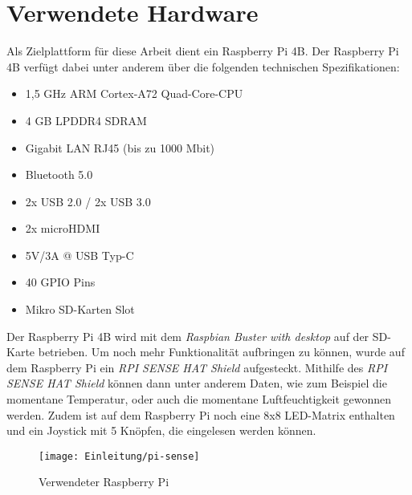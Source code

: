 \section{Verwendete Hardware}
\label{sec:verwendeteHardware}
Als Zielplattform für diese Arbeit dient ein Raspberry Pi 4B. Der Raspberry Pi 4B
verfügt dabei unter anderem über die folgenden technischen Spezifikationen: \cite{RasberryPiSpecs}
\begin{itemize}
    \item 1,5 GHz ARM Cortex-A72 Quad-Core-CPU
    \item 4 GB LPDDR4 SDRAM
    \item Gigabit LAN RJ45 (bis zu 1000 Mbit)
    \item Bluetooth 5.0
    \item 2x USB 2.0 / 2x USB 3.0
    \item 2x microHDMI
    \item 5V/3A @ USB Typ-C
    \item 40 GPIO Pins
    \item Mikro SD-Karten Slot
\end{itemize}
Der Raspberry Pi 4B wird mit dem \emph{Raspbian Buster with desktop} auf der SD-Karte betrieben.
\newline
Um noch mehr Funktionalität aufbringen zu können, wurde auf dem Raspberry Pi ein
\emph{RPI SENSE HAT Shield} aufgesteckt. Mithilfe des \emph{RPI SENSE HAT Shield} können dann
unter anderem Daten, wie zum Beispiel die momentane Temperatur, oder auch die momentane
Luftfeuchtigkeit gewonnen werden. Zudem ist auf dem Raspberry Pi noch eine 8x8 LED-Matrix enthalten
und ein Joystick mit 5 Knöpfen, die eingelesen werden können.
\begin{figure}[h]
    \centering
    \texttt{[image: Einleitung/pi-sense]}
    \caption[Raspberry Pi 4 B]{Verwendeter Raspberry Pi}
    \label{img:piSense}
\end{figure}

